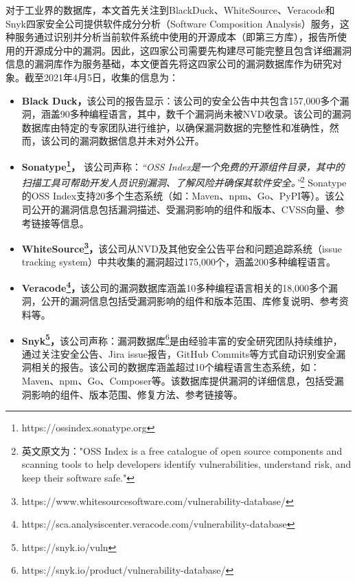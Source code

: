 对于工业界的数据库，本文首先关注到BlackDuck\cite{blackduck}、WhiteSource\cite{whitesource}、Veracode\cite{veracode}和Snyk\cite{snyk}四家安全公司提供软件成分分析（Software Composition Analysis）服务，这种服务通过识别并分析当前软件系统中使用的开源成本（即第三方库），报告所使用的开源成分中的漏洞。因此，这四家公司需要先构建尽可能完整且包含详细漏洞信息的漏洞库作为服务基础，本文便首先将这四家公司的漏洞数据库作为研究对象。截至2021年4月5日，收集的信息为：

\begin{itemize}[leftmargin=*]
\item\textbf{Black Duck，}该公司的报告显示：该公司的安全公告中共包含157,000多个漏洞，涵盖90多种编程语言，其中，数千个漏洞尚未被NVD收录。该公司的漏洞数据库由特定的专家团队进行维护，以确保漏洞数据的完整性和准确性，然而，该公司的漏洞数据信息并未对外公开。
\item\textbf{Sonatype\footnote{https://ossindex.sonatype.org}，} 该公司声称：\textit{“OSS Index是一个免费的开源组件目录，其中的扫描工具可帮助开发人员识别漏洞、了解风险并确保其软件安全。”}\footnote{英文原文为："OSS Index is a free catalogue of open source components and scanning tools to help developers identify vulnerabilities, understand risk, and keep their software safe."} Sonatype的OSS Index支持20多个生态系统（如：Maven、npm、Go、PyPI等）。该公司公开的漏洞信息包括漏洞描述、受漏洞影响的组件和版本、CVSS向量、参考链接等信息。
\item\textbf{WhiteSource\footnote{https://www.whitesourcesoftware.com/vulnerability-database/}，}该公司从NVD及其他安全公告平台和问题追踪系统（issue tracking system）中共收集的漏洞超过175,000个，涵盖200多种编程语言。
\item\textbf{Veracode\footnote{https://sca.analysiscenter.veracode.com/vulnerability-database}，}该公司的漏洞数据库涵盖10多种编程语言相关的18,000多个漏洞，公开的漏洞信息包括受漏洞影响的组件和版本范围、库修复说明、参考资料等。
\item\textbf{Snyk\footnote{https://snyk.io/vuln}，}该公司声称：漏洞数据库\footnote{https://snyk.io/product/vulnerability-database/}是由经验丰富的安全研究团队持续维护，通过关注安全公告、Jira issue报告，GitHub Commits等方式自动识别安全漏洞相关的报告。该公司的数据库涵盖超过10个编程语言生态系统，如：Maven、npm、Go、Composer等。该数据库提供漏洞的详细信息，包括受漏洞影响的组件、版本范围、修复方法、参考链接等。
\end{itemize}

